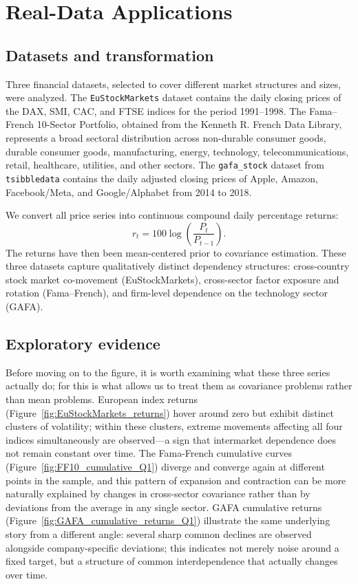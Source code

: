 \documentclass[11pt,a4paper]{article}
\begin{document}
\section{Real-Data Applications}
\label{sec:realdata}

\subsection{Datasets and transformation}

Three financial datasets, selected to
cover different market structures and sizes, were analyzed. The \texttt{EuStockMarkets} dataset
contains the daily closing prices of the DAX, SMI, CAC, and FTSE indices
for the period 1991–1998.  The Fama–French 10-Sector Portfolio, obtained from the Kenneth R. French Data Library,
represents a broad sectoral distribution across
non-durable consumer goods, durable consumer goods, manufacturing, energy, technology, telecommunications,
retail, healthcare, utilities, and other sectors. The \texttt{gafa\_stock} dataset from \texttt{tsibbledata}
contains the daily adjusted closing prices of Apple,
Amazon, Facebook/Meta, and Google/Alphabet from 2014 to 2018.

We convert all price series into continuous compound daily percentage
returns:
\[
r_{t} = 100\log\!\left(\frac{P_{t}}{P_{t-1}}\right).
\]
The returns have then been mean-centered prior to covariance estimation. These three datasets
capture qualitatively distinct dependency structures: cross-country stock
market co-movement (EuStockMarkets), cross-sector factor exposure and rotation
(Fama–French), and firm-level dependence on the technology sector (GAFA).

\subsection{Exploratory evidence}

Before moving on to the figure, it is worth examining
what these three series actually do; for this is what allows us to treat them
as covariance problems rather than mean problems. European index returns
(Figure~\ref{fig:EuStockMarkets_returns}) hover around zero but exhibit distinct
clusters of volatility; within these clusters, extreme movements affecting all four indices simultaneously
are observed—a sign that intermarket dependence does not
remain constant over time. The Fama-French cumulative curves
(Figure~\ref{fig:FF10_cumulative_Q1}) diverge and converge again at different points in the sample,
and this pattern of expansion and contraction
can be more naturally explained by changes in cross-sector covariance
rather than by deviations from the average in any single sector. GAFA cumulative returns
(Figure~\ref{fig:GAFA_cumulative_returns_Q1}) illustrate the same underlying story
from a different angle: several sharp common declines
are observed alongside company-specific deviations; this indicates not merely noise around a fixed target,
but a structure of common interdependence that actually changes over time.
\end{document}
